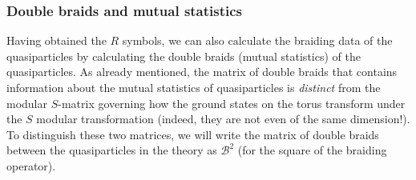 \documentclass[12pt,a4paper]{article}
\newcommand{\unit}{\mathds{1}}
\newcommand{\mcb}{\mathcal{B}}
\newcommand{\mct}{\mathcal{T}}
\begin{document}
\subsubsection{Double braids and mutual statistics}

Having obtained the $R$ symbols, we can also calculate the braiding data of the quasiparticles by calculating 
the double braids (mutual statistics) of the quasiparticles. 
As already mentioned, the matrix of double braids that contains information about the mutual statistics of quasiparticles is {\it distinct} from the modular $S$-matrix governing how the ground states on the torus transform under the $S$ modular transformation (indeed, they are not even of the same dimension!). 
To distinguish these two matrices, we will write the matrix of double braids between the 
quasiparticles in the theory as $\mcb^2$ (for the square of the braiding operator). 
\end{document}
